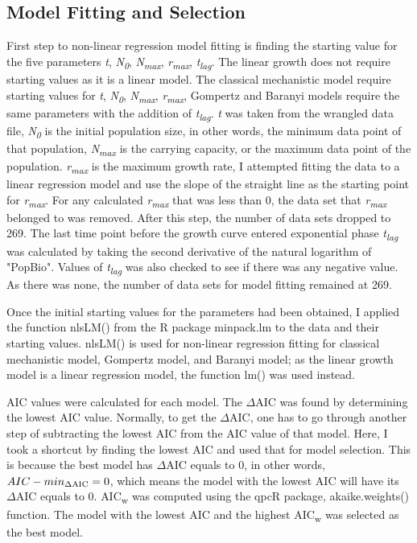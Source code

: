\documentclass[11pt]{article}
\begin{document}
\subsection{Model Fitting and Selection}
First step to non-linear regression model fitting is finding the starting value for the five parameters \emph{t}, \emph{N\textsubscript{0}}, \emph{N\textsubscript{max}}, \emph{r\textsubscript{max}}, \emph{t\textsubscript{lag}}. The linear growth does not require starting values as it is a linear model. The classical mechanistic model require starting values for \emph{t}, \emph{N\textsubscript{0}}, \emph{N\textsubscript{max}}, \emph{r\textsubscript{max}}, Gompertz and Baranyi models require the same parameters with the addition of \emph{t\textsubscript{lag}}.  \emph{t} was taken from the wrangled data file, \emph{N\textsubscript{0}} is the initial population size, in other words, the minimum data point of that population, \emph{N\textsubscript{max}} is the carrying capacity, or the maximum data point of the population. \emph{r\textsubscript{max}} is the maximum growth rate, I attempted fitting the data to a linear regression model and use the slope of the straight line as the starting point for \emph{r\textsubscript{max}}. For any calculated \emph{r\textsubscript{max}} that was less than 0, the data set that \emph{r\textsubscript{max}} belonged to was removed. After this step, the number of data sets dropped to 269. The last time point before the growth curve entered exponential phase \emph{t\textsubscript{lag}} was calculated by taking the second derivative of the natural logarithm of "PopBio". Values of \emph{t\textsubscript{lag}} was also checked to see if there was any negative value. As there was none, the number of data sets for model fitting remained at 269. 

Once the initial starting values for the parameters had been obtained, I applied the function nlsLM() from the R package minpack.lm to the data and their starting values. nlsLM() is used for non-linear regression fitting for classical mechanistic model, Gompertz model, and Baranyi model; as the linear growth model is a linear regression model, the function lm() was used instead. 

AIC values were calculated for each model. The $\Delta$AIC was found by determining the lowest AIC value. Normally, to get the $\Delta$AIC, one has to go through another step of subtracting the lowest AIC from the AIC value of that model. Here, I took a shortcut by finding the lowest AIC and used that for model selection. This is because the best model has $\Delta$AIC equals to 0, in other words, $AIC - {min\textsubscript{$\Delta$AIC}} = 0$, which means the model with the lowest AIC will have its $\Delta$AIC equals to 0. {AIC\textsubscript{w}} was computed using the qpcR package, akaike.weights() function. The model with the lowest AIC and the highest {AIC\textsubscript{w}} was selected as the best model.
\newpage
\end{document}
